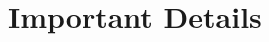 \chapter{Important Details}
\label{chapter:Details}
\thispagestyle{myheadings}

\graphicspath{{3_Details/Figures/}}
%
%
%
%
%
%
%
%
%
